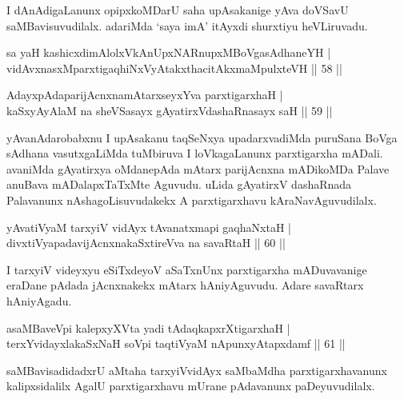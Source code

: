 \begin{artha} 
I dAnAdigaLanunx opipxkoMDarU saha upAsakanige yAva doVSavU 
saMBavisuvudilalx. adariMda `saya imA' itAyxdi shurxtiyu heVLiruvadu.
\end{artha}


\begin{shl}
sa yaH kashicxdimAlolxVkAnUpxNARnupxMBoVgasAdhaneYH | \\
vidAvxnasxMparxtigaqhiNxVyAtakxthacitAkxmaMpulxteVH \hfill ||  58 || 
\end{shl}

\begin{shl}
AdayxpAdaparijAcnxnamAtarxseyxYva parxtigarxhaH  | \\
kaSxyAyAlaM na sheVSasayx gAyatirxVdashaRnasayx saH \hfill ||  59 || 
\end{shl}

\begin{artha} 
yAvanAdarobabxnu I upAsakanu taqSeNxya upadarxvadiMda puruSana BoVga 
sAdhana vasutxgaLiMda tuMbiruva I loVkagaLanunx parxtigarxha mADali. 
avaniMda gAyatirxya oMdanepAda mAtarx parijAcnxna mADikoMDa Palave 
anuBava mADalapxTaTxMte Aguvudu. uLida gAyatirxV dashaRnada Palavanunx 
nAshagoLisuvudakekx A parxtigarxhavu kAraNavAguvudilalx.
\end{artha}


\begin{shl}
yAvatiVyaM tarxyiV vidAyx tAvanatxmapi gaqhaNxtaH | \\
divxtiVyapadavijAcnxnakaSxtireVva na savaRtaH \hfill ||  60 || 
\end{shl}

\begin{artha} 
I tarxyiV videyxyu eSiTxdeyoV aSaTxnUnx parxtigarxha mADuvavanige 
eraDane pAdada jAcnxnakekx mAtarx hAniyAguvudu. Adare savaRtarx 
hAniyAgadu.
\end{artha}

\begin{shl}
asaMBaveV\s pi kalepxyXVta yadi tAdaqkapxrXtigarxhaH | \\
terxYvidayxlakaSxNaH soV\s pi taqtiVyaM nA\s \s punxyAtapxdamf \hfill ||  61 || 
\end{shl}

\begin{artha} 
saMBavisadidadxrU aMtaha tarxyiVvidAyx saMbaMdha parxtigarxhavanunx 
kalipxsidalilx AgalU parxtigarxhavu mUrane pAdavanunx paDeyuvudilalx.
\end{artha}

